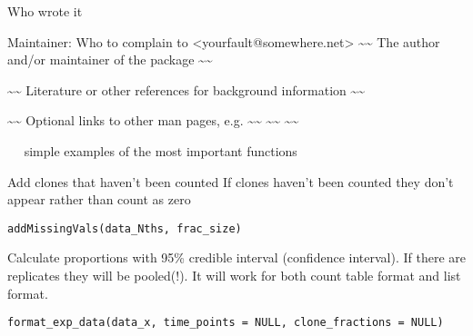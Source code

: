 \documentclass[a4paper]{book}
\begin{document}
%
\begin{Author}\relax
Who wrote it

Maintainer: Who to complain to <yourfault@somewhere.net>
\textasciitilde{}\textasciitilde{} The author and/or maintainer of the package \textasciitilde{}\textasciitilde{}
\end{Author}
%
\begin{References}\relax
\textasciitilde{}\textasciitilde{} Literature or other references for background information \textasciitilde{}\textasciitilde{}
\end{References}
%
\begin{SeeAlso}\relax
\textasciitilde{}\textasciitilde{} Optional links to other man pages, e.g. \textasciitilde{}\textasciitilde{}
\textasciitilde{}\textasciitilde{}  \textasciitilde{}\textasciitilde{}
\end{SeeAlso}
%
\begin{Examples}
\begin{ExampleCode}
~~ simple examples of the most important functions ~~
\end{ExampleCode}
\end{Examples}
%
\begin{Description}\relax
Add clones that haven't been counted
If clones haven't been counted they don't appear rather than
count as zero
\end{Description}
%
\begin{Usage}
\begin{verbatim}
addMissingVals(data_Nths, frac_size)
\end{verbatim}
\end{Usage}
%
\begin{Description}\relax
Calculate proportions with 95\% credible interval (confidence interval).
If there are replicates they will be pooled(!). It will work for both count table format and list format.
\end{Description}
%
\begin{Usage}
\begin{verbatim}
format_exp_data(data_x, time_points = NULL, clone_fractions = NULL)
\end{verbatim}
\end{Usage}
\end{document}
